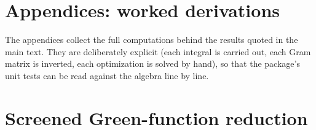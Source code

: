 \documentclass[11pt]{article}
\begin{document}
\appendix
\renewcommand{\thesection}{\Alph{section}}
\setcounter{section}{0}

\section*{Appendices: worked derivations}
The appendices collect the full computations behind the results quoted in the main text. They are deliberately explicit (each integral is carried out, each Gram matrix is inverted, each optimization is solved by hand), so that the package's unit tests can be read against the algebra line by line.

\section{Screened Green-function reduction}
\label{app:green}
\end{document}
